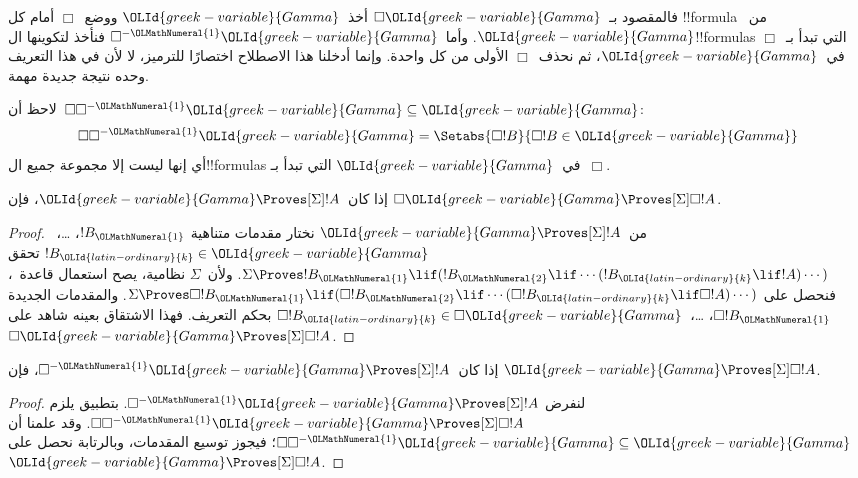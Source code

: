 \documentclass[../../../include/open-logic-section]{subfiles}
\begin{document}
فالمقصود بـ~$\Box{\OLId{greek-variable}{Gamma}}$ أخذ~${\OLId{greek-variable}{Gamma}}$ ووضع~$\Box$ أمام كل
!!{formula} من~${\OLId{greek-variable}{Gamma}}$. وأما~$\Box^{-{\OLMathNumeral{1}}}{\OLId{greek-variable}{Gamma}}$ فنأخذ لتكوينها
ال!!{formula}s التي تبدأ بـ~$\Box$ في~${\OLId{greek-variable}{Gamma}}$، ثم نحذف~$\Box$ الأولى
من كل واحدة. وإنما أدخلنا هذا الاصطلاح اختصارًا للترميز،
لا لأن في هذا التعريف وحده نتيجة جديدة مهمة.

لاحظ أن~$\Box\Box^{-{\OLMathNumeral{1}}}{\OLId{greek-variable}{Gamma}} \subseteq {\OLId{greek-variable}{Gamma}}$:
\[
\Box\Box^{-{\OLMathNumeral{1}}}{\OLId{greek-variable}{Gamma}} = \Setabs{\Box!B}{\Box!B \in {\OLId{greek-variable}{Gamma}}}
\]
أي إنها ليست إلا مجموعة جميع ال!!{formula}s في~${\OLId{greek-variable}{Gamma}}$ التي تبدأ
بـ~$\Box$.

\begin{lem}
  إذا كان~${\OLId{greek-variable}{Gamma}} \Proves[\Sigma] !A$، فإن
  $\Box{\OLId{greek-variable}{Gamma}} \Proves[\Sigma] \Box !A$.
\end{lem}

\begin{proof}
  من~${\OLId{greek-variable}{Gamma}} \Proves[\Sigma] !A$ نختار مقدمات متناهية
  $!B_{\OLMathNumeral{1}}$، \dots،~$!B_{\OLId{latin-ordinary}{k}} \in {\OLId{greek-variable}{Gamma}}$ تحقق
  $\Sigma \Proves !B_{\OLMathNumeral{1}} \lif (!B_{\OLMathNumeral{2}} \lif \cdots (!B_{\OLId{latin-ordinary}{k}} \lif !A)\cdots)$.
  ولأن~$\Sigma$ نظامية، يصح استعمال قاعدة~\RK{}، فنحصل على
  $\Sigma \Proves \Box!B_{\OLMathNumeral{1}} \lif (\Box!B_{\OLMathNumeral{2}} \lif \cdots
  (\Box!B_{\OLId{latin-ordinary}{k}} \lif \Box!A)\cdots)$.
  والمقدمات الجديدة $\Box!B_{\OLMathNumeral{1}}$، \dots،~$\Box!B_{\OLId{latin-ordinary}{k}} \in \Box{\OLId{greek-variable}{Gamma}}$
  بحكم التعريف. فهذا الاشتقاق بعينه شاهد على
  $\Box{\OLId{greek-variable}{Gamma}} \Proves[\Sigma] \Box !A$.
\end{proof}

\begin{lem}
  إذا كان~$\Box^{-{\OLMathNumeral{1}}}{\OLId{greek-variable}{Gamma}} \Proves[\Sigma] !A$، فإن
  ${\OLId{greek-variable}{Gamma}} \Proves[\Sigma] \Box!A$.
\end{lem}

\begin{proof}
  لنفرض $\Box^{-{\OLMathNumeral{1}}}{\OLId{greek-variable}{Gamma}} \Proves[\Sigma] !A$.
  بتطبيق  يلزم
  $\Box\Box^{-{\OLMathNumeral{1}}}{\OLId{greek-variable}{Gamma}} \Proves[\Sigma] \Box!A$.
  وقد علمنا أن $\Box\Box^{-{\OLMathNumeral{1}}}{\OLId{greek-variable}{Gamma}} \subseteq {\OLId{greek-variable}{Gamma}}$؛
  فيجوز توسيع المقدمات، وبالرتابة نحصل على
  ${\OLId{greek-variable}{Gamma}} \Proves[\Sigma] \Box!A$.
\end{proof}
\end{document}
